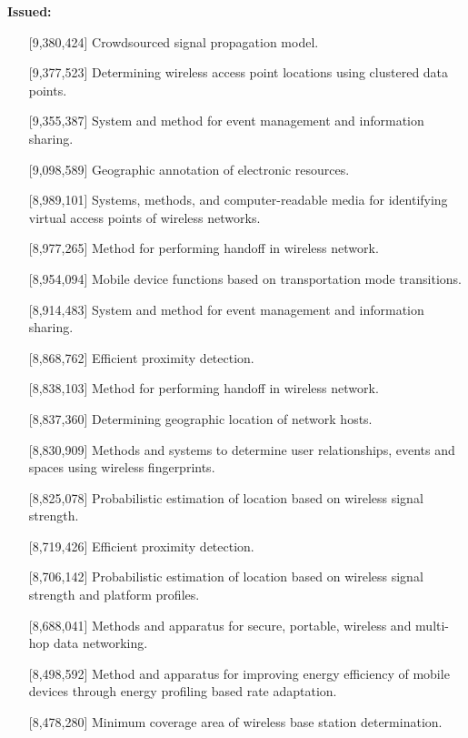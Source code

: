 \begin{resume}
\vspace{-0.7cm}

{\bf Issued:}
    \begin{itemize}
       \item [] [9,380,424] Crowdsourced signal propagation model.
       \item [] [9,377,523] Determining wireless access point locations using clustered data points.
       \item [] [9,355,387] System and method for event management and information sharing.
       \item [] [9,098,589] Geographic annotation of electronic resources.
       \item [] [8,989,101] Systems, methods, and computer-readable media for identifying virtual access points of
           wireless networks.
       \item [] [8,977,265] Method for performing handoff in wireless network.
       \item [] [8,954,094] Mobile device functions based on transportation mode transitions.
       \item [] [8,914,483] System and method for event management and information sharing.
       \item [] [8,868,762] Efficient proximity detection.
       \item [] [8,838,103] Method for performing handoff in wireless network.
       \item [] [8,837,360] Determining geographic location of network hosts.
       \item [] [8,830,909] Methods and systems to determine user relationships, events and spaces using wireless
           fingerprints.
       \item [] [8,825,078] Probabilistic estimation of location based on wireless signal strength.
       \item [] [8,719,426] Efficient proximity detection.
       \item [] [8,706,142] Probabilistic estimation of location based on wireless signal strength and platform
           profiles.
       \item [] [8,688,041] Methods and apparatus for secure, portable, wireless and multi-hop data networking.
       \item [] [8,498,592] Method and apparatus for improving energy efficiency of mobile devices through energy
           profiling based rate adaptation.
       \item [] [8,478,280] Minimum coverage area of wireless base station determination.

\end{itemize}
\end{resume}
